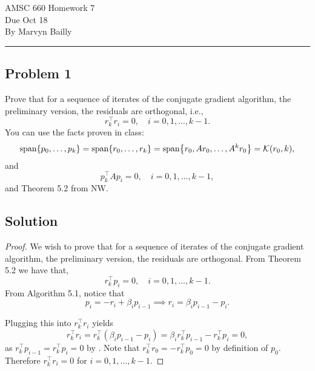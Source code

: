 \documentclass[12pt]{report}
\begin{document}
\large
\begin{center}
AMSC 660 Homework 7\\
Due Oct 18\\
By Marvyn Bailly\\
\end{center}
\normalsize
\hrule


\begin{problem}%
\subsection*{Problem 1}

Prove that for a sequence of iterates of the conjugate gradient algorithm, the preliminary version, the residuals are orthogonal, i.e.,
\[
     r_k^\top r_i = 0, \quad i=0,1,\dots,k-1.
\]
You can use the facts proven in class:
\[
     \text{span}{\left\{p_0,\dots,p_k\right\}} = \text{span}{\left\{r_0,\dots,r_k\right\}} = \text{span}{\left\{r_0,Ar_0,\dots,A^k r_0\right\}} = \mathcal{K}(r_0,k),
\]
and
\[
     p_k^\top Ap_i = 0, \quad i=0,1,\dots,k-1,
\]
and Theorem 5.2 from NW.


\subsection*{Solution}
\begin{proof}

We wish to prove that for a sequence of iterates of the conjugate gradient algorithm, the preliminary version, the residuals are orthogonal. From Theorem 5.2 we have that,
\begin{equation} \label{5.11}
    r_k^\top p_i = 0, \quad i=0,1,\dots,k-1.
\end{equation}
From Algorithm 5.1, notice that
\begin{equation} \label{5.14e}
    p_i = -r_i + \beta_i p_{i-1} \implies r_i = \beta_i p_{i-1} - p_i.
\end{equation}

Plugging this into $r_k^\top r_i$ yields
\[
    r_k^\top r_i = r_k^\top(\beta_i p_{i-1} - p_i) = \beta_i r_k^\top p_{i-1} - r_k^\top p_i = 0,
\]
as $r_k^\top p_{i-1} = r_k^\top p_i = 0$ by . Note that $r_k^\top r_0 = -r_k^\top p_0 = 0$ by definition of $p_0$. Therefore $r_k^\top r_i = 0$ for $i=0,1,\dots,k-1$.


\end{proof}
\end{problem}
\end{document}
